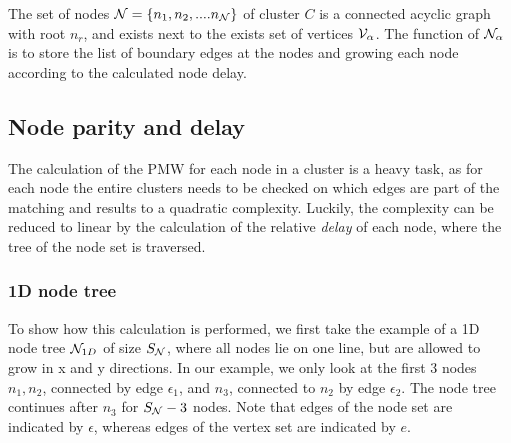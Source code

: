 \begin{theorem}
  The set of nodes $\mathcal{N} = \{n_1, n_2, .... n_{\mathcal{N}}\}$ of cluster $C$ is a connected acyclic graph with root $n_r$, and exists next to the exists set of vertices $\mathcal{V}_\alpha$. The function of $\mathcal{N}_\alpha$ is to store the list of boundary edges at the nodes and growing each node according to the calculated node delay.
\end{theorem}


\subsection{Node parity and delay}\label{sec:nodedelay}

The calculation of the PMW for each node in a cluster is a heavy task, as for each node the entire clusters needs to be checked on which edges are part of the matching and results to a quadratic complexity. Luckily, the complexity can be reduced to linear by the calculation of the relative \emph{delay} of each node, where the tree of the node set is traversed.

\subsubsection{1D node tree}

To show how this calculation is performed, we first take the example of a 1D node tree $\mathcal{N}_{1D}$ of size $S_{\mathcal{N}}$, where all nodes lie on one line, but are allowed to grow in x and y directions. In our example, we only look at the first 3 nodes $n_1, n_2$, connected by edge $\epsilon_{1}$, and $n_3$, connected to $n_2$ by edge $\epsilon_{2}$. The node tree continues after $n_3$ for $S_{\mathcal{N}} - 3$ nodes. Note that edges of the node set are indicated by $\epsilon$, whereas edges of the vertex set are indicated by $e$. 


